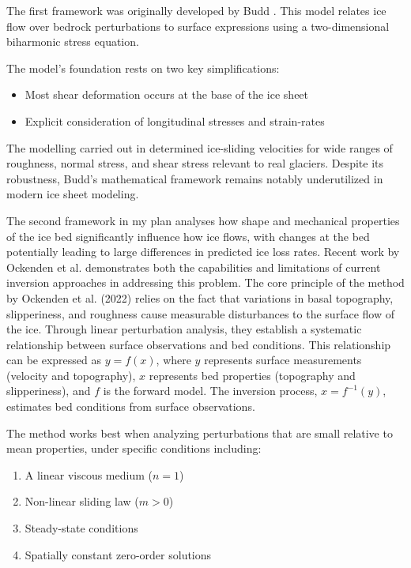 The first framework was originally developed by Budd \cite{Budd_1970}. This model relates ice flow over bedrock perturbations to surface expressions using a two-dimensional biharmonic stress equation. 

The model's foundation rests on two key simplifications:
\begin{itemize}
    \item Most shear deformation occurs at the base of the ice sheet
    \item Explicit consideration of longitudinal stresses and strain-rates
\end{itemize}

The modelling carried out in\cite{Budd_1970} determined ice-sliding velocities for wide ranges of roughness, normal stress, and shear stress relevant to real glaciers\cite{Budd_1970}. Despite its robustness, Budd's mathematical framework remains notably underutilized in modern ice sheet modeling. 

The second framework in my plan analyses how shape and mechanical properties of the ice bed significantly influence how ice flows, with changes at the bed potentially leading to large differences in predicted ice loss rates\cite{Ockenden_2022}. Recent work by Ockenden et al. demonstrates both the capabilities and limitations of current inversion approaches in addressing this problem.
The core principle of the method by Ockenden et al. (2022) relies on the fact that variations in basal topography, slipperiness, and roughness cause measurable disturbances to the surface flow of the ice. Through linear perturbation analysis, they establish a systematic relationship between surface observations and bed conditions. This relationship can be expressed as $y=f(x)$, where $y$ represents surface measurements (velocity and topography), $x$ represents bed properties (topography and slipperiness), and $f$ is the forward model\cite{Gudmundsson_2008}. The inversion process, $x=f^{-1}(y)$, estimates bed conditions from surface observations.%

The method works best when analyzing perturbations that are small relative to mean properties, under specific conditions including:
\begin{enumerate}
    \item A linear viscous medium ($n=1$)
    \item Non-linear sliding law ($m>0$)
    \item Steady-state conditions
    \item Spatially constant zero-order solutions
\end{enumerate}

